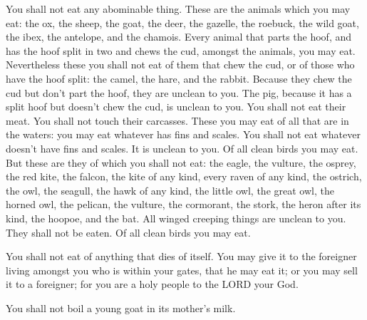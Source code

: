  You shall not eat any abominable thing. 
These are the animals which you may eat: the ox, the sheep, the goat,
 the deer, the gazelle, the roebuck, the wild goat, the
ibex, the antelope, and the chamois.  Every animal that
parts the hoof, and has the hoof split in two and chews the cud, amongst
the animals, you may eat.  Nevertheless these you shall
not eat of them that chew the cud, or of those who have the hoof split:
the camel, the hare, and the rabbit. Because they chew the cud but don't
part the hoof, they are unclean to you.  The pig, because
it has a split hoof but doesn't chew the cud, is unclean to you. You
shall not eat their meat. You shall not touch their carcasses.
 These you may eat of all that are in the waters: you may
eat whatever has fins and scales.  You shall not eat
whatever doesn't have fins and scales. It is unclean to you.
 Of all clean birds you may eat.  But
these are they of which you shall not eat: the eagle, the vulture, the
osprey,  the red kite, the falcon, the kite of any kind,
 every raven of any kind,  the ostrich,
the owl, the seagull, the hawk of any kind,  the little
owl, the great owl, the horned owl,  the pelican, the
vulture, the cormorant,  the stork, the heron after its
kind, the hoopoe, and the bat.  All winged creeping
things are unclean to you. They shall not be eaten.  Of
all clean birds you may eat.

 You shall not eat of anything that dies of itself. You
may give it to the foreigner living amongst you who is within your
gates, that he may eat it; or you may sell it to a foreigner; for you
are a holy people to the LORD your God.

You shall not boil a young goat in its mother's milk.

